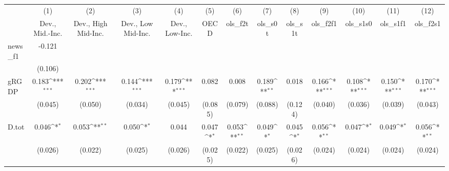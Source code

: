 {
\def\sym#1{\ifmmode^{#1}\else\(^{#1}\)\fi}
\begin{tabular}{l*{12}{c}}
\toprule
            &\multicolumn{1}{c}{(1)}&\multicolumn{1}{c}{(2)}&\multicolumn{1}{c}{(3)}&\multicolumn{1}{c}{(4)}&\multicolumn{1}{c}{(5)}&\multicolumn{1}{c}{(6)}&\multicolumn{1}{c}{(7)}&\multicolumn{1}{c}{(8)}&\multicolumn{1}{c}{(9)}&\multicolumn{1}{c}{(10)}&\multicolumn{1}{c}{(11)}&\multicolumn{1}{c}{(12)}\\
            &\multicolumn{1}{c}{Dev., Mid.-Inc.}&\multicolumn{1}{c}{Dev., High Mid-Inc.}&\multicolumn{1}{c}{Dev., Low Mid-Inc.}&\multicolumn{1}{c}{Dev., Low-Inc.}&\multicolumn{1}{c}{OECD}&\multicolumn{1}{c}{ols\_f2t}&\multicolumn{1}{c}{ols\_s0t}&\multicolumn{1}{c}{ols\_s1t}&\multicolumn{1}{c}{ols\_f2f1}&\multicolumn{1}{c}{ols\_s1s0}&\multicolumn{1}{c}{ols\_s1f1}&\multicolumn{1}{c}{ols\_f2s1}\\
\midrule
news\_f1     &      -0.121         &                     &                     &                     &                     &                     &                     &                     &                     &                     &                     &                     \\
            &     (0.106)         &                     &                     &                     &                     &                     &                     &                     &                     &                     &                     &                     \\
\addlinespace
gRGDP       &       0.183\sym{***}&       0.202\sym{***}&       0.144\sym{***}&       0.179\sym{***}&       0.082         &       0.008         &       0.189\sym{**} &       0.018         &       0.166\sym{***}&       0.108\sym{***}&       0.150\sym{***}&       0.170\sym{***}\\
            &     (0.045)         &     (0.050)         &     (0.034)         &     (0.045)         &     (0.085)         &     (0.079)         &     (0.088)         &     (0.124)         &     (0.040)         &     (0.036)         &     (0.039)         &     (0.043)         \\
\addlinespace
D.tot       &       0.046\sym{*}  &       0.053\sym{**} &       0.050\sym{*}  &       0.044         &       0.047\sym{*}  &       0.053\sym{**} &       0.049\sym{*}  &       0.045\sym{*}  &       0.056\sym{**} &       0.047\sym{*}  &       0.049\sym{*}  &       0.056\sym{**} \\
            &     (0.026)         &     (0.022)         &     (0.025)         &     (0.026)         &     (0.025)         &     (0.022)         &     (0.025)         &     (0.026)         &     (0.024)         &     (0.024)         &     (0.024)         &     (0.024)         \\

\end{tabular}}
